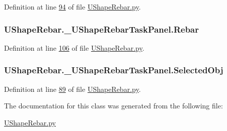 Definition at line \hyperlink{UShapeRebar_8py_source_l00094}{94} of file \hyperlink{UShapeRebar_8py_source}{U\+Shape\+Rebar.\+py}.

\subsubsection[{\texorpdfstring{Rebar}{Rebar}}]{\setlength{\rightskip}{0pt plus 5cm}U\+Shape\+Rebar.\+\_\+\+U\+Shape\+Rebar\+Task\+Panel.\+Rebar}\hypertarget{classUShapeRebar_1_1__UShapeRebarTaskPanel_a01238597180da20c197d4c02925814f6}{}\label{classUShapeRebar_1_1__UShapeRebarTaskPanel_a01238597180da20c197d4c02925814f6}


Definition at line \hyperlink{UShapeRebar_8py_source_l00106}{106} of file \hyperlink{UShapeRebar_8py_source}{U\+Shape\+Rebar.\+py}.

\subsubsection[{\texorpdfstring{Selected\+Obj}{SelectedObj}}]{\setlength{\rightskip}{0pt plus 5cm}U\+Shape\+Rebar.\+\_\+\+U\+Shape\+Rebar\+Task\+Panel.\+Selected\+Obj}\hypertarget{classUShapeRebar_1_1__UShapeRebarTaskPanel_a74e2f5a2b08a8ae07513d6aa8ace25c6}{}\label{classUShapeRebar_1_1__UShapeRebarTaskPanel_a74e2f5a2b08a8ae07513d6aa8ace25c6}


Definition at line \hyperlink{UShapeRebar_8py_source_l00089}{89} of file \hyperlink{UShapeRebar_8py_source}{U\+Shape\+Rebar.\+py}.



The documentation for this class was generated from the following file\+:\begin{DoxyCompactItemize}
\item 
\hyperlink{UShapeRebar_8py}{U\+Shape\+Rebar.\+py}\end{DoxyCompactItemize}
